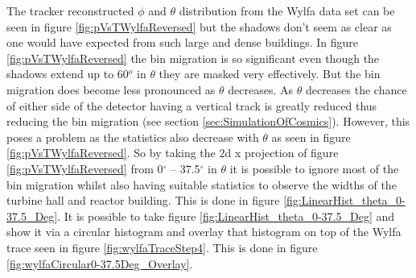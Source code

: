 The tracker reconstructed $\phi$ and $\theta$ distribution from the Wylfa data set can be seen in figure \ref{fig:pVsTWylfaReversed} but the shadows don't seem as clear as one would have expected from such large and dense buildings. In figure \ref{fig:pVsTWylfaReversed} the bin migration is so significant even though the shadows extend up to 60$^o$ in $\theta$ they are masked very effectively. But the bin migration does become less pronounced as $\theta$ decreases. As $\theta$ decreases the chance of either side of the detector having a vertical track is greatly reduced thus reducing the bin migration (see section \ref{sec:SimulationOfCosmics}). However, this poses a problem as the statistics also decrease with $\theta$ as seen in figure \ref{fig:pVsTWylfaReversed}. So by taking the 2d x projection of figure \ref{fig:pVsTWylfaReversed} from 0$^\circ$ -- 37.5$^\circ$ in $\theta$ it is possible to ignore most of the bin migration whilst also having suitable statistics to observe the widths of the turbine hall and reactor building. This is done in figure \ref{fig:LinearHist_theta_0-37.5_Deg}. It is possible to take figure \ref{fig:LinearHist_theta_0-37.5_Deg} and show it via a circular histogram and overlay that histogram on top of the Wylfa trace seen in figure \ref{fig:wylfaTraceStep4}. This is done in figure \ref{fig:wylfaCircular0-37.5Deg_Overlay}. 


